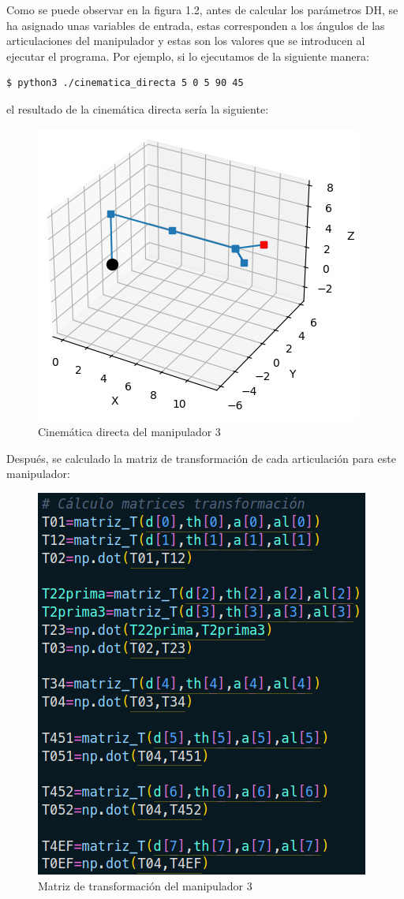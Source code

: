 \documentclass[11pt]{report}
\begin{document}
Como se puede observar en la figura 1.2, antes de calcular los parámetros DH, se ha
asignado unas variables de entrada, estas corresponden a los ángulos de las articulaciones del manipulador
y estas son los valores que se introducen al ejecutar el programa. Por ejemplo, si lo ejecutamos de la siguiente
manera:
\begin{verbatim}
$ python3 ./cinematica_directa 5 0 5 90 45
\end{verbatim}

el resultado de la cinemática directa sería la siguiente:
\begin{figure}[H]
  \centering
  \includegraphics[scale=0.7]{img/cinematica_directa.png}
  \caption{Cinemática directa del manipulador 3}
\end{figure}

\newpage

Después, se calculado la matriz de transformación de cada articulación para este manipulador:
\begin{figure}[H]
  \centering
  \includegraphics[scale=0.5]{img/matriz_transformacion.png}
  \caption{Matriz de transformación del manipulador 3}
\end{figure}
\end{document}
